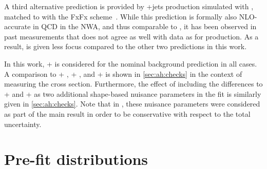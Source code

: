 A third alternative prediction is provided by \ttbar+jets production simulated with \amcatnlo, matched to \pythia with the FxFx scheme~\cite{Frederix:2012ps}. While this prediction is formally also NLO-accurate in QCD in the NWA, and thus comparable to \powheg \hvq, it has been observed in past measurements that \amcatnlo does not agree as well with data as \powheg for \ttbar production. As a result, \amcatnlo is given less focus compared to the other two predictions in this work.

In this work, \powheg \hvq + \pythia is considered for the nominal background prediction in all cases. A comparison to \powheg \hvq + \herwig, \amcatnlo + \pythia, and \bbfourl + \pythia is shown in \cref{sec:ah:checks} in the context of measuring the \etat cross section. Furthermore, the effect of including the differences to \powheg \hvq + \herwig and \bbfourl + \pythia as two additional shape-based nuisance parameters in the fit is similarly given in \cref{sec:ah:checks}. Note that in , these nuisance parameters were considered as part of the main result in order to be conservative with respect to the total uncertainty.

\section{Pre-fit distributions}
\label{sec:ah:prefit}

